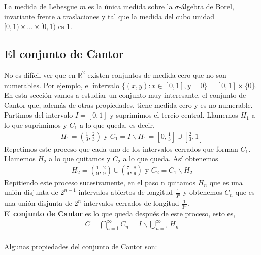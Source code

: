 \begin{teo}
La medida de Lebesgue $m$ es la única medida sobre la $\sigma$-álgebra de Borel, invariante frente a traslaciones y tal que la medida del cubo unidad $[0,1) \times ... \times [0,1)$ es 1.
\end{teo}

\subsection{El conjunto de Cantor}
No es difícil ver que en $\mathbb{R}^2$ existen conjuntos de medida cero que no son numerables. Por ejemplo, el intervalo $\{ (x,y) : x \in [0,1], y = 0\} = [0,1] \times \{0\}$. En esta sección vamos a estudiar un conjunto muy interesante, el conjunto de Cantor que, además de otras propiedades, tiene medida cero y es no numerable.
\\
\newline
Partimos del intervalo $I = [0,1]$ y suprimimos el tercio central. Llamemos $H_1$ a lo que suprimimos y $C_1$ a lo que queda, es decir,
\begin{align*}
    H_1 = \left( \frac{1}{3}, \frac{2}{3}\right) \text{ y } C_1 = I \backslash H_1 = \left[ 0, \frac{1}{3} \right] \cup \left[ \frac{2}{3}, 1\right]
\end{align*}
Repetimos este proceso que cada uno de los intervalos cerrados que forman $C_1$. Llamemos $H_2$ a lo que quitamos y $C_2$ a lo que queda. Así obtenemos
\begin{align*}
    H_2 = \left( \frac{1}{9}, \frac{2}{9}\right) \cup \left( \frac{7}{9}, \frac{8}{9}\right) \text{ y } C_2 = C_1 \backslash H_2
\end{align*}
Repitiendo este proceso sucesivamente, en el paso n quitamos $H_n$ que es una unión disjunta de $2^{n-1}$ intervalos abiertos de longitud $\frac{1}{3^n}$ y obtenemos $C_n$ que es una unión disjunta de $2^n$ intervalos cerrados de longitud $\frac{1}{3^n}$. 
\\
\newline
El \textbf{conjunto de Cantor} es lo que queda después de este proceso, esto es,
\begin{align*}
    C = \bigcap_{n=1}^{\infty}{C_n} = I \backslash \bigcup_{n=1}^{\infty}{H_n}
\end{align*}
\\
\newline
Algunas propiedades del conjunto de Cantor son:
